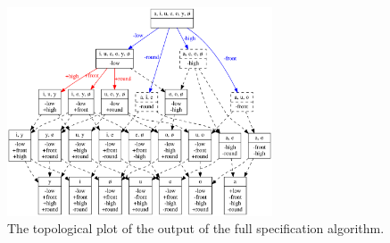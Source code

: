 \documentclass[12pt, oneside]{article}   	%
\begin{document}
\begin{figure}[htb!]
\centering
\includegraphics[width=0.7\textwidth]{vowel_inventory_full_TOPOLOGICAL.png}
\caption{The topological plot of the output of the full specification algorithm.}
\label{fig:vowelfulltopological}
\end{figure}




\end{document}
